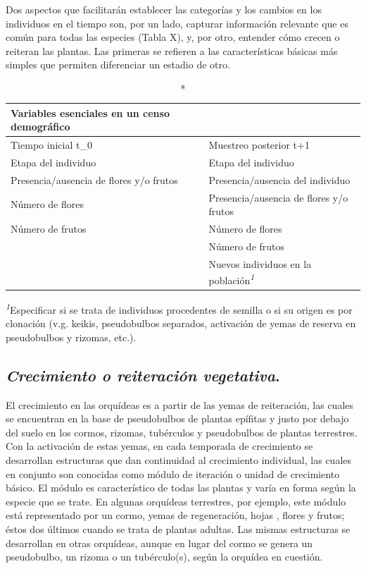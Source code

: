 \documentclass[
]{book}
\theoremstyle{definition}
\theoremstyle{definition}
\theoremstyle{definition}
\theoremstyle{definition}
\theoremstyle{remark}
\begin{document}
Dos aspectos que facilitarán establecer las categorías y los cambios en los individuos en el tiempo son, por un lado, capturar información relevante que es común para todas las especies (Tabla X), y, por otro, entender cómo crecen o reiteran las plantas.
Las primeras se refieren a las características básicas más simples que permiten diferenciar un estadio de otro.

\setlength{\LTpost}{0mm}
\begin{longtable}{ll}
\caption*{
{\large \textbf{Variables esenciales en un censo demográfico}}
} \\ 
\toprule
Tiempo inicial t\_0 & Muestreo posterior t+1 \\ 
\midrule\addlinespace[2.5pt]
Etapa del individuo & Etapa del individuo \\ 
Presencia/ausencia de flores y/o frutos & Presencia/ausencia del individuo \\ 
Número de flores & Presencia/ausencia de flores y/o frutos \\ 
Número de frutos & Número de flores \\ 
 & Número de frutos \\ 
 & Nuevos individuos en la población\textsuperscript{\textit{1}} \\ 
\bottomrule
\end{longtable}
\begin{minipage}{\linewidth}
\textsuperscript{\textit{1}}Especificar si se trata de individuos procedentes de semilla o si su origen es por clonación (v.g. keikis, pseudobulbos separados, activación de yemas de reserva en pseudobulbos y rizomas, etc.).\\
\end{minipage}

\subsection{\texorpdfstring{\emph{Crecimiento o reiteración vegetativa}.}{Crecimiento o reiteración vegetativa.}}\label{crecimiento-o-reiteraciuxf3n-vegetativa.}

El crecimiento en las orquídeas es a partir de las yemas de reiteración, las cuales se encuentran en la base de pseudobulbos de plantas epífitas y justo por debajo del suelo en los cormos, rizomas, tubérculos y pseudobulbos de plantas terrestres.
Con la activación de estas yemas, en cada temporada de crecimiento se desarrollan estructuras que dan continuidad al crecimiento individual, las cuales en conjunto son conocidas como módulo de iteración o unidad de crecimiento básico.
El módulo es característico de todas las plantas \citep{harper1977population} y varía en forma según la especie que se trate.
En algunas orquídeas terrestres, por ejemplo, este módulo está representado por un cormo, yemas de regeneración, hojas , flores y frutos; éstos dos últimos cuando se trata de plantas adultas.
Las mismas estructuras se desarrollan en otras orquídeas, aunque en lugar del cormo se genera un pseudobulbo, un rizoma o un tubérculo(s), según la orquídea en cuestión.
\end{document}

